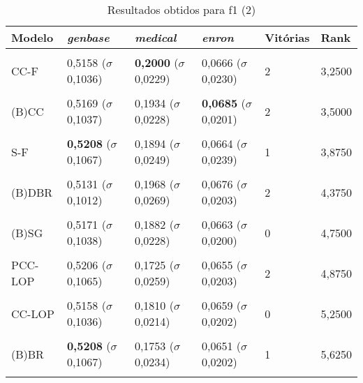\begin{table}[htbp]
	\centering
	\caption{Resultados obtidos para f1 (2)}
		\begin{tabular}
        { p{0.88in} p{0.88in} p{0.88in} p{0.88in} p{0.88in} p{0.88in} }
        
        \hline
Modelo & \textit{genbase} & \textit{medical} & \textit{enron} & \textbf{Vitórias} & \textbf{Rank} \\ 
\hline \\

CC-F & 0,5158 \newline ($\sigma$ 0,1036) & \textbf{0,2000} \newline ($\sigma$ 0,0229) & 0,0666 \newline ($\sigma$ 0,0230) & 2 & 3,2500 \\ \\
(B)CC & 0,5169 \newline ($\sigma$ 0,1037) & 0,1934 \newline ($\sigma$ 0,0228) & \textbf{0,0685} \newline ($\sigma$ 0,0201) & 2 & 3,5000 \\ \\
S-F & \textbf{0,5208} \newline ($\sigma$ 0,1067) & 0,1894 \newline ($\sigma$ 0,0249) & 0,0664 \newline ($\sigma$ 0,0239) & 1 & 3,8750 \\ \\
(B)DBR & 0,5131 \newline ($\sigma$ 0,1012) & 0,1968 \newline ($\sigma$ 0,0269) & 0,0676 \newline ($\sigma$ 0,0203) & 2 & 4,3750 \\ \\
(B)SG & 0,5171 \newline ($\sigma$ 0,1038) & 0,1882 \newline ($\sigma$ 0,0228) & 0,0663 \newline ($\sigma$ 0,0200) & 0 & 4,7500 \\ \\
PCC-LOP & 0,5206 \newline ($\sigma$ 0,1065) & 0,1725 \newline ($\sigma$ 0,0259) & 0,0655 \newline ($\sigma$ 0,0203) & 2 & 4,8750 \\ \\
CC-LOP & 0,5158 \newline ($\sigma$ 0,1036) & 0,1810 \newline ($\sigma$ 0,0214) & 0,0659 \newline ($\sigma$ 0,0202) & 0 & 5,2500 \\ \\
(B)BR & \textbf{0,5208} \newline ($\sigma$ 0,1067) & 0,1753 \newline ($\sigma$ 0,0234) & 0,0651 \newline ($\sigma$ 0,0202) & 1 & 5,6250 \\ \\


\end{tabular}
\end{table}
